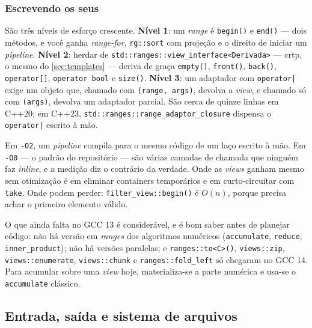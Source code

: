 \subsubsection{Escrevendo os seus}

São três níveis de esforço crescente. \textbf{Nível 1}: um \emph{range} é
\texttt{begin()} e \texttt{end()} --- dois métodos, e você ganha
\emph{range-for}, \texttt{rg::sort} com projeção e o direito de iniciar um
\emph{pipeline}. \textbf{Nível 2}: herdar de
\texttt{std::ranges::view\_interface<Derivada>} --- \gls{crtp}, o mesmo do
\cref{sec:templates} --- deriva de graça \texttt{empty()}, \texttt{front()},
\texttt{back()}, \texttt{operator[]}, \texttt{operator bool} e \texttt{size()}.
\textbf{Nível 3}: um adaptador com \texttt{operator|} exige um objeto que,
chamado com \texttt{(range, args)}, devolva a \emph{view}, e chamado só com
\texttt{(args)}, devolva um adaptador parcial. São cerca de quinze linhas em
C++20; em C++23, \texttt{std::ranges::range\_adaptor\_closure} dispensa o
\texttt{operator|} escrito à mão.

\begin{armadilha}
Em \texttt{-O2}, um \emph{pipeline} compila para o mesmo código de um laço
escrito à mão. Em \texttt{-O0} --- o padrão do repositório --- são várias
camadas de chamada que ninguém faz \emph{inline}, e a medição diz o contrário
da verdade. Onde as \emph{views} ganham mesmo sem otimização é em eliminar
containers temporários e em curto-circuitar com \texttt{take}. Onde podem
perder: \texttt{filter\_view::begin()} é $O(n)$, porque precisa achar o primeiro
elemento válido.
\end{armadilha}

O que ainda falta no GCC 13 é considerável, e é bom saber antes de planejar
código: não há versão em \emph{ranges} dos algoritmos numéricos
(\texttt{accumulate}, \texttt{reduce}, \texttt{inner\_product}); não há versões
paralelas; e \texttt{ranges::to<C>()}, \texttt{views::zip},
\texttt{views::enumerate}, \texttt{views::chunk} e \texttt{ranges::fold\_left}
só chegaram no GCC 14. Para acumular sobre uma \emph{view} hoje, materializa-se
a parte numérica e usa-se o \texttt{accumulate} clássico.

\subsection{Entrada, saída e sistema de arquivos}
\label{sec:file-io}

